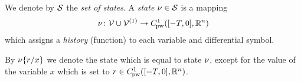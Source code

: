     We denote by $\states$ the \emph{set of states}. A \emph{state} $\asstate\in\states$ is a mapping
    \begin{equation}
        \asstate \from \allvars\cup\diffvars \to \statespace
    \end{equation}
    which assigns a \emph{history} (function) to each variable and differential symbol.

    By $\modif{\asstate}{x}{r}$ we denote the state which is equal to state $\asstate$, except for the value of the variable $x$ which is set to $r\in\statespace$.


    

